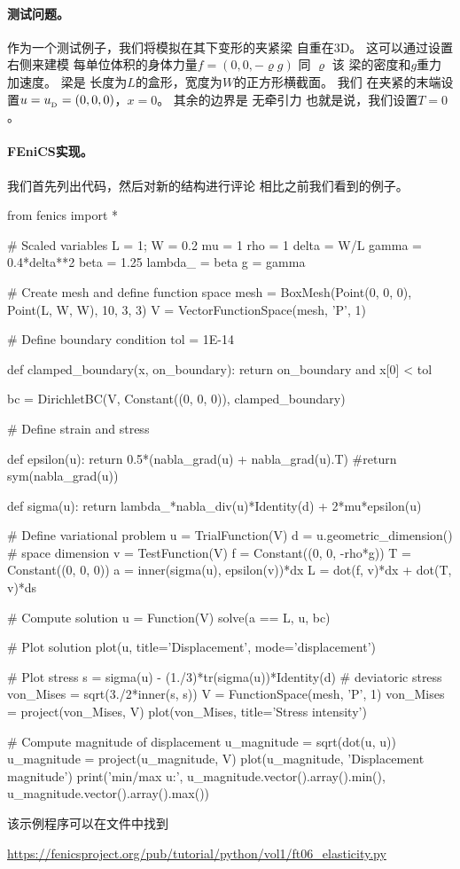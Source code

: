 \paragraph{测试问题。}
作为一个测试例子，我们将模拟在其下变形的夹紧梁
自重在3D。 这可以通过设置右侧来建模
每单位体积的身体力量$f=(0,0,-\varrho g)$ 同 $\varrho$ 该
梁的密度和$g$重力加速度。 梁是
长度为$L$的盒形，宽度为$W$的正方形横截面。 我们
在夹紧的末端设置$u=u_{_\mathrm{D}} = (0,0,0)$，$x=0$。 其余的边界是
无牵引力 也就是说，我们设置$T = 0$。

\paragraph{FEniCS实现。}
我们首先列出代码，然后对新的结构进行评论
相比之前我们看到的例子。

\begin{python}
from fenics import *

# Scaled variables
L = 1; W = 0.2
mu = 1
rho = 1
delta = W/L
gamma = 0.4*delta**2
beta = 1.25
lambda_ = beta
g = gamma

# Create mesh and define function space
mesh = BoxMesh(Point(0, 0, 0), Point(L, W, W), 10, 3, 3)
V = VectorFunctionSpace(mesh, 'P', 1)

# Define boundary condition
tol = 1E-14

def clamped_boundary(x, on_boundary):
    return on_boundary and x[0] < tol

bc = DirichletBC(V, Constant((0, 0, 0)), clamped_boundary)

# Define strain and stress

def epsilon(u):
    return 0.5*(nabla_grad(u) + nabla_grad(u).T)
    #return sym(nabla_grad(u))

def sigma(u):
    return lambda_*nabla_div(u)*Identity(d) + 2*mu*epsilon(u)

# Define variational problem
u = TrialFunction(V)
d = u.geometric_dimension()  # space dimension
v = TestFunction(V)
f = Constant((0, 0, -rho*g))
T = Constant((0, 0, 0))
a = inner(sigma(u), epsilon(v))*dx
L = dot(f, v)*dx + dot(T, v)*ds

# Compute solution
u = Function(V)
solve(a == L, u, bc)

# Plot solution
plot(u, title='Displacement', mode='displacement')

# Plot stress
s = sigma(u) - (1./3)*tr(sigma(u))*Identity(d)  # deviatoric stress
von_Mises = sqrt(3./2*inner(s, s))
V = FunctionSpace(mesh, 'P', 1)
von_Mises = project(von_Mises, V)
plot(von_Mises, title='Stress intensity')

# Compute magnitude of displacement
u_magnitude = sqrt(dot(u, u))
u_magnitude = project(u_magnitude, V)
plot(u_magnitude, 'Displacement magnitude')
print('min/max u:',
      u_magnitude.vector().array().min(),
      u_magnitude.vector().array().max())
\end{python}
该示例程序可以在文件中找到
\begin{center}
  \url{https://fenicsproject.org/pub/tutorial/python/vol1/ft06_elasticity.py}
\end{center}

